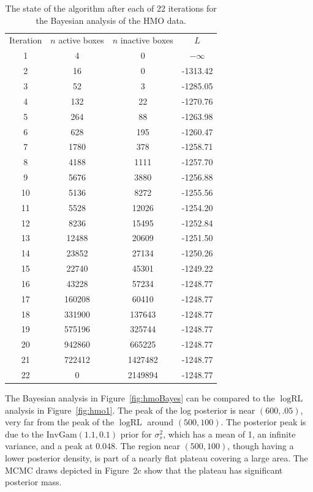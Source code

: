 \documentclass{report}
\newcommand{\IG}{\text{InvGam}}
\newcommand{\RLorig}{\text{RL}}
\newcommand{\logRLorig}{\log\RLorig}
\newcommand{\sigssq}{\sigma_s^2}
\begin{document}
\begin{table}[H]
\centering
\begin{tabular}{|c|c|c|c|}
\hline
Iteration & $n$ active boxes & $n$ inactive boxes & $L$\\
1 & 4 & 0 & $-\infty$\\
2 & 16 & 0 & -1313.42\\
3 & 52 & 3 & -1285.05\\
4 & 132 & 22 & -1270.76\\
5 & 264 & 88 & -1263.98\\
6 & 628 & 195 & -1260.47\\
7 & 1780 & 378 & -1258.71\\
8 & 4188 & 1111 & -1257.70\\
9 & 5676 & 3880 & -1256.88\\
10 & 5136 & 8272 & -1255.56\\
11 & 5528 & 12026 & -1254.20\\
12 & 8236 & 15495 & -1252.84\\
13 & 12488 & 20609 & -1251.50\\
14 & 23852 & 27134 & -1250.26\\
15 & 22740 & 45301 & -1249.22\\
16 & 43228 & 57234 & -1248.77\\
17 & 160208 & 60410 & -1248.77\\
18 & 331900 & 137643 & -1248.77\\
19 & 575196 & 325744 & -1248.77\\
20 & 942860 & 665225 & -1248.77\\
21 & 722412 & 1427482 & -1248.77\\
22 & 0 & 2149894 & -1248.77\\
\hline
\end{tabular}
\caption{The state of the algorithm after each of 22 iterations for the Bayesian analysis of the HMO data.}
\label{table:hmo_HH11Bayes}
\end{table}
The Bayesian analysis in Figure~\ref{fig:hmoBayes} can be compared to the $\logRLorig$ analysis in Figure~\ref{fig:hmo1}.  The peak of the log posterior is near $(600, .05)$, very far from the peak of the $\logRLorig$ around $(500,100)$.  The posterior peak is due to the $\IG(1.1,0.1)$ prior for $\sigssq$, which has a mean of 1, an infinite variance, and a peak at 0.048.  The region near $(500,100)$, though having a lower posterior density, is part of a nearly flat plateau covering a large area.  The MCMC draws depicted in \cite{henn&hodges:2014} Figure~2c show that the plateau has significant posterior mass.
\end{document}
